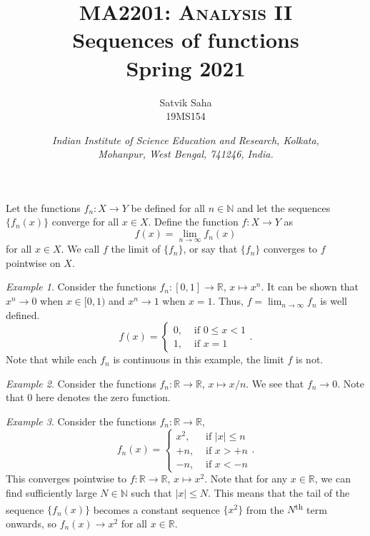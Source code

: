 \documentclass[11pt]{article}
\title{
    \Large\textsc{MA2201: Analysis II} \\
    \Huge \textbf{Sequences of functions} \\
    \vspace{5pt}
    \Large{Spring 2021}
}
\author{
    \large Satvik Saha%
    \\\textsc{\small 19MS154}
}
\date{\normalsize
    \textit{Indian Institute of Science Education and Research, Kolkata, \\
    Mohanpur, West Bengal, 741246, India.} \\
}
\def\R{\mathbb{R}}
\def\N{\mathbb{N}}
\theoremstyle{definition}
\theoremstyle{remark}
\newtheorem*{example}{Example}
\numberwithin{equation}{module}
\begin{document}
    \maketitle

    \begin{definition}
        Let the functions $f_n\colon X \to Y$ be defined for all $n \in \mathbb{N}$
        and let the sequences $\{f_n(x)\}$ converge for all $x \in X$. Define the
        function $f\colon X \to Y$ as \[
            f(x) = \lim_{n \to \infty} f_n(x) 
        \] for all $x \in X$. We call $f$ the limit of $\{f_n\}$, or say that
        $\{f_n\}$ converges to $f$ pointwise on $X$.
    \end{definition}
    \begin{example}
        Consider the functions $f_n\colon [0, 1] \to \R$, $x \mapsto x^n$.
        It can be shown that $x^n \to 0$ when $x \in [0, 1)$ and 
        $x^n \to 1$ when $x = 1$. Thus, $f = \lim_{n \to \infty} f_n$ is well
        defined. \[
            f(x) = \begin{cases}
                0, &\text{ if } 0 \leq x < 1 \\
                1, &\text{ if } x = 1
            \end{cases}.
        \] 
        Note that while each $f_n$ is continuous in this example, the limit $f$
        is not.
    \end{example}
    \begin{example}
        Consider the functions $f_n\colon \R \to \R$, $x \mapsto x/n$.
        We see that $f_n \to 0$. Note that $0$ here denotes the zero function.
    \end{example}
    \begin{example}
        Consider the functions $f_n\colon \R \to \R$, \[
            f_n(x) = \begin{cases}
                x^2, &\text{ if }|x| \leq n\\
                +n, &\text{ if } x > +n \\
                -n, &\text{ if } x < -n
            \end{cases}.
        \] 
        This converges pointwise to $f\colon \R \to \R$, $x \mapsto x^2$.
        Note that for any $x \in \R$, we can find sufficiently large $N \in \N$ such
        that $|x| \leq N$.  This means that the tail of the sequence $\{f_n(x)\}$
        becomes a constant sequence $\{x^2\}$ from the $N$\textsuperscript{th} term
        onwards, so $f_n(x) \to x^2$ for all $x \in \R$.
    \end{example}
\end{document}
